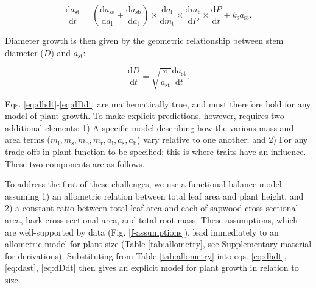 \documentclass[12pt, a4paper]{article}
\begin{document}
\begin{equation}\label{eq:dast}
\frac{\textrm{d}a_\textrm{st}}{\textrm{d}t}=
\left(\frac{\textrm{d}a_\textrm{ss}}{\textrm{d}a_\textrm{l}} + \frac{\textrm{d}a_\textrm{sb}}{\textrm{d}a_\textrm{l}}\right) \times
\frac{\textrm{d}a_\textrm{l}}{\textrm{d}m_\textrm{t}} \times \frac{\textrm{d}m_\textrm{t}}{\textrm{d}P} \times \frac{\textrm{d}P}{\textrm{d}t} + k_\textrm{s} a_\textrm{ss}.
\end{equation}

Diameter growth is then given by the geometric relationship between stem
diameter (\(D\)) and \(a_\textrm{st}\):

\begin{equation} \label{eq:dDdt}
\frac{\textrm{d}D}{\textrm{d}t}= \sqrt{\frac{\pi}{a_\textrm{st}}} \frac{\textrm{d}a_\textrm{st}}{\textrm{d}t}.
\end{equation}

Eqs. \ref{eq:dhdt}-\ref{eq:dDdt} are mathematically true, and must
therefore hold for any model of plant growth. To make explicit
predictions, however, requires two additional elements: 1) A specific
model describing how the various mass and area terms
(\(m_\textrm{l}, m_\textrm{s}, m_\textrm{b}, m_\textrm{r}, a_\textrm{l}, a_\textrm{s}, a_\textrm{b}\))
vary relative to one another; and 2) For any trade-offs in plant
function to be specified; this is where traits have an influence. These
two components are as follows.

To address the first of these challenges, we use a functional balance
model\citep{yokozawa_foliage_1995,falster_influence_2011} assuming
1) an allometric relation between total leaf area and plant height, and
2) a constant ratio between total leaf area and each of sapwood
cross-sectional area, bark cross-sectional area, and total root mass.
These assumptions, which are well-supported by data (Fig.
\ref{f-assumptions}), lead immediately to an allometric model for plant
size (Table \ref{tab:allometry}, see Supplementary material for
derivations). Substituting from Table \ref{tab:allometry} into eqs.
\ref{eq:dhdt}, \ref{eq:dast}, \ref{eq:dDdt} then gives an explicit model
for plant growth in relation to size.
\end{document}
